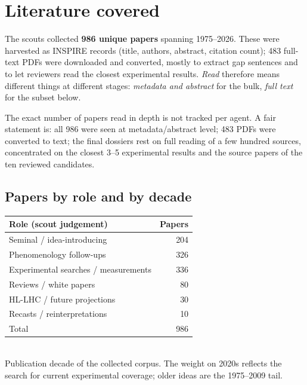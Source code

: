 \documentclass[11pt,a4paper]{article}
\begin{document}
\section{Literature covered}
The scouts collected \textbf{986 unique papers} spanning 1975--2026. These were harvested as INSPIRE records (title, authors, abstract, citation count); 483 full-text PDFs were downloaded and converted, mostly to extract gap sentences and to let reviewers read the closest experimental results. \textit{Read} therefore means different things at different stages: \emph{metadata and abstract} for the bulk, \emph{full text} for the subset below.
\begin{caution}The exact number of papers read in depth is not tracked per agent. A fair statement is: all 986 were seen at metadata/abstract level; 483 PDFs were converted to text; the final dossiers rest on full reading of a few hundred sources, concentrated on the closest 3--5 experimental results and the source papers of the ten reviewed candidates.\end{caution}
\subsection{Papers by role and by decade}
\begin{center}\begin{tabular}{lr}\toprule Role (scout judgement) & Papers\\\midrule
Seminal / idea-introducing & 204\\
Phenomenology follow-ups & 326\\
Experimental searches / measurements & 336\\
Reviews / white papers & 80\\
HL-LHC / future projections & 30\\
Recasts / reinterpretations & 10\\
\midrule Total & 986\\\bottomrule\end{tabular}\end{center}
\begin{center}\\[-2pt]{\small Publication decade of the collected corpus. The weight on 2020s reflects the search for current experimental coverage; older ideas are the 1975--2009 tail.}\end{center}
\end{document}
